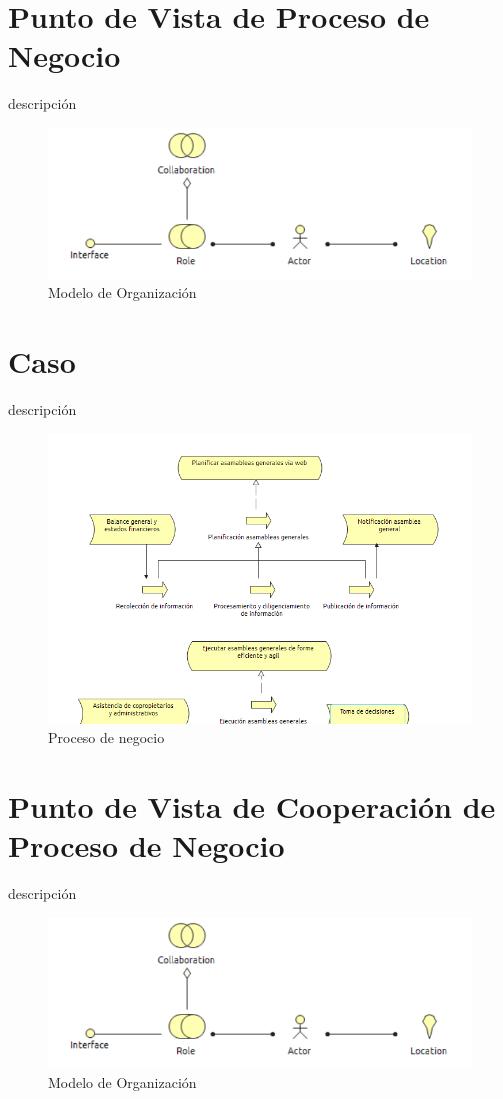 \section{Punto de Vista de Proceso de Negocio}
descripción


\begin{figure}[th!]
	\centering
	\includegraphics[width=0.7\linewidth]{arquitectura/negocio/imgs/m_organizacion}
	\caption{Modelo de Organización}
\end{figure}

\newpage
\section{Caso}
descripción

\begin{figure}[th!]
	\centering
	\includegraphics[width=0.7\linewidth]{arquitectura/negocio/imgs/proceso}
	\caption{Proceso de negocio}
\end{figure}
\newpage

\section{Punto de Vista de Cooperación de Proceso de Negocio}
descripción


\begin{figure}[th!]
	\centering
	\includegraphics[width=0.7\linewidth]{arquitectura/negocio/imgs/m_organizacion}
	\caption{Modelo de Organización}
\end{figure}

